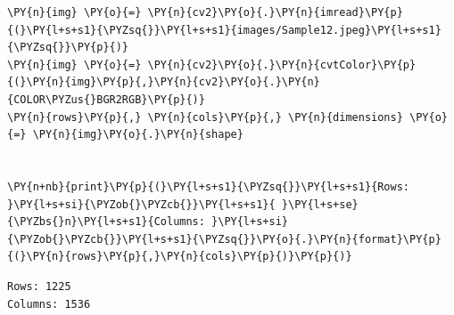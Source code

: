 \begin{tcolorbox}[breakable, size=fbox, boxrule=1pt, pad at break*=1mm,colback=cellbackground, colframe=cellborder]
	\begin{Verbatim}[commandchars=\\\{\}]
\PY{n}{img} \PY{o}{=} \PY{n}{cv2}\PY{o}{.}\PY{n}{imread}\PY{p}{(}\PY{l+s+s1}{\PYZsq{}}\PY{l+s+s1}{images/Sample12.jpeg}\PY{l+s+s1}{\PYZsq{}}\PY{p}{)}
\PY{n}{img} \PY{o}{=} \PY{n}{cv2}\PY{o}{.}\PY{n}{cvtColor}\PY{p}{(}\PY{n}{img}\PY{p}{,}\PY{n}{cv2}\PY{o}{.}\PY{n}{COLOR\PYZus{}BGR2RGB}\PY{p}{)}
\PY{n}{rows}\PY{p}{,} \PY{n}{cols}\PY{p}{,} \PY{n}{dimensions} \PY{o}{=} \PY{n}{img}\PY{o}{.}\PY{n}{shape}


\PY{n+nb}{print}\PY{p}{(}\PY{l+s+s1}{\PYZsq{}}\PY{l+s+s1}{Rows: }\PY{l+s+si}{\PYZob{}\PYZcb{}}\PY{l+s+s1}{ }\PY{l+s+se}{\PYZbs{}n}\PY{l+s+s1}{Columns: }\PY{l+s+si}{\PYZob{}\PYZcb{}}\PY{l+s+s1}{\PYZsq{}}\PY{o}{.}\PY{n}{format}\PY{p}{(}\PY{n}{rows}\PY{p}{,}\PY{n}{cols}\PY{p}{)}\PY{p}{)}
	\end{Verbatim}
\end{tcolorbox}


\begin{Verbatim}[commandchars=\\\{\}]
Rows: 1225
Columns: 1536
\end{Verbatim}

